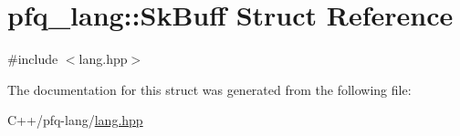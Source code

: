 \hypertarget{structpfq__lang_1_1SkBuff}{\section{pfq\+\_\+lang\+:\+:Sk\+Buff Struct Reference}
\label{structpfq__lang_1_1SkBuff}
}


{\ttfamily \#include $<$lang.\+hpp$>$}



The documentation for this struct was generated from the following file\+:\begin{DoxyCompactItemize}
\item 
C++/pfq-\/lang/\hyperlink{lang_8hpp}{lang.\+hpp}\end{DoxyCompactItemize}
